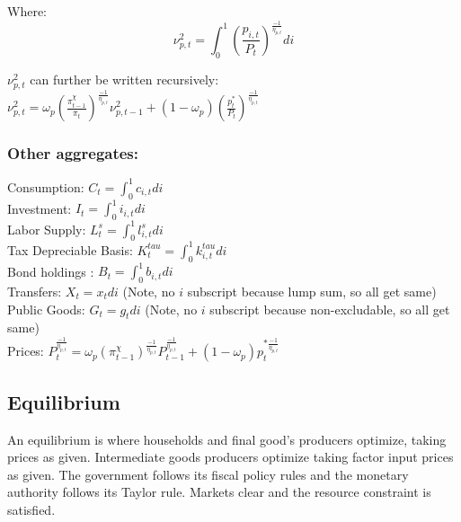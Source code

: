\documentclass[article,11pt,letterpaper,fleqn]{article}
\theoremstyle{definition}
\numberwithin{equation}{section}
\begin{document}
Where: 
\begin{equation}
\label{price_disp2}
\nu^{2}_{p,t}=\int_{0}^{1}\left(\frac{p_{i,t}}{P_{t}}\right)^{\frac{-1}{\eta_{p,t}}}di
\end{equation}

 $\nu^{2}_{p,t}$ can further be written recursively: $\nu^{2}_{p,t} = \omega_{p}\left(\frac{\pi^{\chi}_{t-1}}{\pi_{t}}\right)^{\frac{-1}{\eta_{p,t}}}\nu^{2}_{p,t-1} + (1-\omega_{p})\left(\frac{p^{*}_{t}}{P_{t}}\right)^{\frac{-1}{\eta_{p,t}}}$


\subsubsection{Other aggregates:}

Consumption: $C_{t}=\int_{0}^{1} c_{i,t} di $\\

Investment: $I_{t} = \int_{0}^{1} i_{i,t} di $\\

Labor Supply: $L^{s}_{t} =  \int_{0}^{1} l^{s}_{i,t} di $\\

Tax Depreciable Basis: $K^{tau}_{t} = \int_{0}^{1} k^{tau}_{i,t} di $\\

Bond holdings : $B_{t} = \int_{0}^{1} b_{i,t} di $\\

Transfers: $X_{t} =  x_{t} di $ (Note, no $i$ subscript because lump sum, so all get same)\\

Public Goods: $G_{t}  =  g_{t} di $ (Note, no $i$ subscript because non-excludable, so all get same)\\

Prices: $P_{t}^{\frac{-1}{\eta_{p,t}}}= \omega_{p}\left(\pi^{\chi}_{t-1}\right)^{\frac{-1}{\eta_{p,t}}} P_{t-1}^{\frac{-1}{\eta_{p,t}}} +(1-\omega_{p})p_{t}^{*\frac{-1}{\eta_{p,t}}}$\\

\subsection{Equilibrium}

An equilibrium is where households and final good's producers optimize, taking prices as given.  Intermediate goods producers optimize taking factor input prices as given.  The government follows its fiscal policy rules and the monetary authority follows its Taylor rule.  Markets clear and the resource constraint is satisfied.
\end{document}
